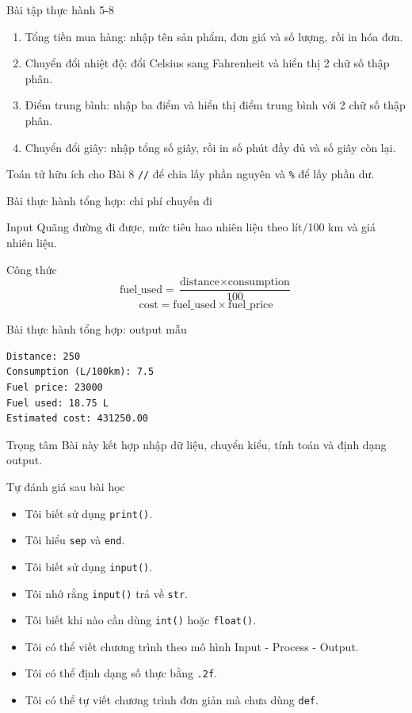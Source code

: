 \documentclass[aspectratio=169,10pt]{beamer}
\begin{document}
\begin{frame}{Bài tập thực hành 5-8}
\begin{enumerate}
  \item Tổng tiền mua hàng: nhập tên sản phẩm, đơn giá và số lượng, rồi in hóa đơn.
  \item Chuyển đổi nhiệt độ: đổi Celsius sang Fahrenheit và hiển thị 2 chữ số thập phân.
  \item Điểm trung bình: nhập ba điểm và hiển thị điểm trung bình với 2 chữ số thập phân.
  \item Chuyển đổi giây: nhập tổng số giây, rồi in số phút đầy đủ và số giây còn lại.
\end{enumerate}
\begin{block}{Toán tử hữu ích cho Bài 8}
\texttt{//} để chia lấy phần nguyên và \texttt{\%} để lấy phần dư.
\end{block}
\end{frame}

\begin{frame}{Bài thực hành tổng hợp: chi phí chuyến đi}
\begin{block}{Input}
Quãng đường đi được, mức tiêu hao nhiên liệu theo lít/100 km và giá nhiên liệu.
\end{block}
\begin{block}{Công thức}
\[
\text{fuel\_used} = \frac{\text{distance} \times \text{consumption}}{100}
\]
\[
\text{cost} = \text{fuel\_used} \times \text{fuel\_price}
\]
\end{block}
\end{frame}

\begin{frame}[fragile]{Bài thực hành tổng hợp: output mẫu}
\begin{verbatim}
Distance: 250
Consumption (L/100km): 7.5
Fuel price: 23000
Fuel used: 18.75 L
Estimated cost: 431250.00
\end{verbatim}
\begin{alertblock}{Trọng tâm}
Bài này kết hợp nhập dữ liệu, chuyển kiểu, tính toán và định dạng output.
\end{alertblock}
\end{frame}

\begin{frame}{Tự đánh giá sau bài học}
\small
\begin{itemize}
  \item Tôi biết sử dụng \texttt{print()}.
  \item Tôi hiểu \texttt{sep} và \texttt{end}.
  \item Tôi biết sử dụng \texttt{input()}.
  \item Tôi nhớ rằng \texttt{input()} trả về \texttt{str}.
  \item Tôi biết khi nào cần dùng \texttt{int()} hoặc \texttt{float()}.
  \item Tôi có thể viết chương trình theo mô hình Input - Process - Output.
  \item Tôi có thể định dạng số thực bằng \texttt{.2f}.
  \item Tôi có thể tự viết chương trình đơn giản mà chưa dùng \texttt{def}.
\end{itemize}
\end{frame}
\end{document}
